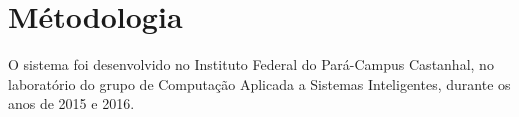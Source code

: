 \chapter{Métodologia}\label{CAP3}

O sistema foi desenvolvido 	no Instituto Federal do Pará-Campus Castanhal, no laboratório do grupo de Computação Aplicada a Sistemas Inteligentes, durante os anos de 2015 e 2016.